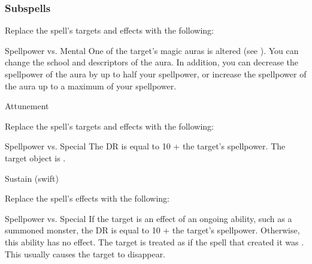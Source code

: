 \subsubsection{Subspells}
Replace the spell's targets and effects with the following:
\begin{spellcontent}
\begin{augmenttargetinginfo}
\end{augmenttargetinginfo}
\begin{augmenteffects}
\begin{spellattack}{Spellpower vs. Mental}
\spellsuccess
One of the target's magic auras is altered (see ).
You can change the school and descriptors of the aura.
In addition, you can decrease the spellpower of the aura by up to half your spellpower, or increase the spellpower of the aura up to a maximum of your spellpower.
\end{spellattack}
\spelldur Attunement
\end{augmenteffects}
\end{spellcontent}
Replace the spell's targets and effects with the following:
\begin{spellcontent}
\begin{augmenttargetinginfo}
\end{augmenttargetinginfo}
\begin{augmenteffects}
\begin{spellattack}{Spellpower vs. Special}
\spellspecial
The DR is equal to 10 + the target's spellpower.
\spellsuccess
The target object is .
\end{spellattack}
\spelldur Sustain (swift)
\end{augmenteffects}
\end{spellcontent}
Replace the spell's effects with the following:
\begin{spellcontent}
\begin{augmenteffects}
\begin{spellattack}{Spellpower vs. Special}
\spellspecial
If the target is an effect of an ongoing  ability, such as a summoned monster, the DR is equal to 10 + the target's spellpower.
Otherwise, this ability has no effect.
\spellsuccess
The target is treated as if the spell that created it was .
This usually causes the target to disappear.
\end{spellattack}
\end{augmenteffects}
\end{spellcontent}
